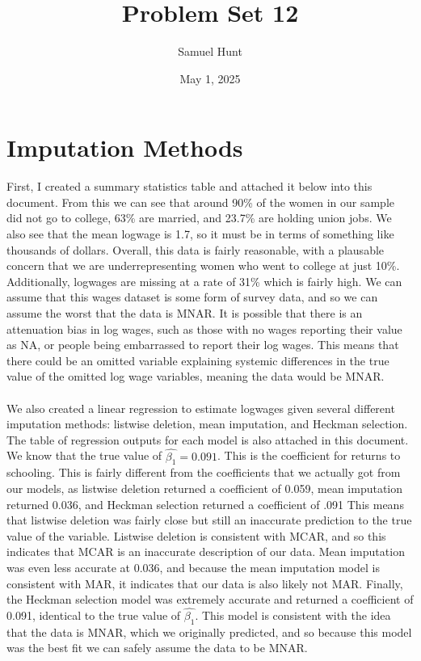 \documentclass{article}
\title{Problem Set 12}
\author{Samuel Hunt}
\date{May 1, 2025}
\begin{document}
\maketitle  %

\section{Imputation Methods}
First, I created a summary statistics table and attached it below into this document. From this we can see that around 90\% of the women in our sample did not go to college, 63\% are married, and 23.7\% are holding union jobs. We also see that the mean logwage is 1.7, so it must be in terms of something like thousands of dollars. Overall, this data is fairly reasonable, with a plausable concern that we are underrepresenting women who went to college at just 10\%. Additionally, logwages are missing at a rate of 31\% which is fairly high. We can assume that this wages dataset is some form of survey data, and so we can assume the worst that the data is MNAR. It is possible that there is an attenuation bias in log wages, such as those with no wages reporting their value as NA, or people being embarrassed to report their log wages. This means that there could be an omitted variable explaining systemic differences in the true value of the omitted log wage variables, meaning the data would be MNAR.
\\
\\We also created a linear regression to estimate logwages given several different imputation methods: listwise deletion, mean imputation, and Heckman selection. The table of regression outputs for each model is also attached in this document. We know that the true value of $\hat{\beta_1} = 0.091$. This is the coefficient for returns to schooling. This is fairly different from the coefficients that we actually got from our models, as listwise deletion returned a coefficient of 0.059, mean imputation returned 0.036, and Heckman selection returned a coefficient of .091 This means that listwise deletion was fairly close but still an inaccurate prediction to the true value of the variable. Listwise deletion is consistent with MCAR, and so this indicates that MCAR is an inaccurate description of our data. Mean imputation was even less accurate at 0.036, and because the mean imputation model is consistent with MAR, it indicates that our data is also likely not MAR. Finally, the Heckman selection model was extremely accurate and returned a coefficient of 0.091, identical to the true value of $\hat{\beta_1}$. This model is consistent with the idea that the data is MNAR, which we originally predicted, and so because this model was the best fit we can safely assume the data to be MNAR.
\end{document}
